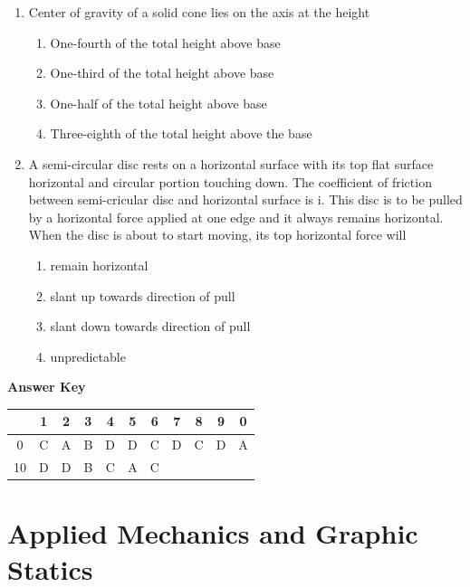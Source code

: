\documentclass[11pt,a4paper]{article}
\begin{document}
\begin{enumerate}
\\
\item{Center of gravity of a solid cone lies on the axis at the height}
\begin{enumerate}[label=\Alph*.]
\item{One-fourth of the total height above base}
\item{One-third of the total height above base}
\item{One-half of the total height above base}
\item{Three-eighth of the total height above the base}
\end{enumerate}
\item{A semi-circular disc rests on a horizontal surface with its top flat surface horizontal and circular portion touching down. The coefficient of friction between semi-cricular disc and horizontal surface is i. This disc is to be pulled by a horizontal force applied at one edge and it always remains horizontal. When the disc is about to start moving, its top horizontal force will}
\begin{enumerate}[label=\Alph*.]
\item{remain horizontal}
\item{slant up towards direction of pull}
\item{slant down towards direction of pull}
\item{unpredictable}
\end{enumerate}
\end{enumerate}
\textbf{Answer Key}
\begin{tabular}{ | c | c c c c c c c c c c | }
\hline
 & 1 & 2 & 3 & 4 & 5 & 6 & 7 & 8 & 9 & 0 \\
\hline
0 & C & A & B & D & D & C & D & C & D & A \\
10 & D & D & B & C & A & C &   &   &   &   \\
\hline
\end{tabular}
\clearpage
\section{Applied Mechanics and Graphic Statics}
\end{document}
